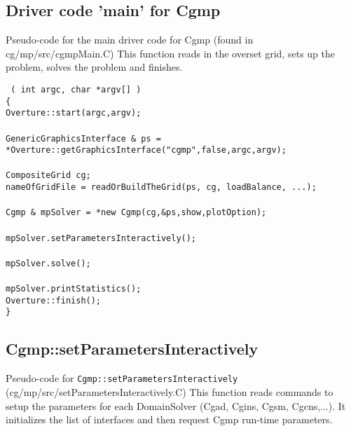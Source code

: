 \newcommand{\WHILE}{{\blue while}}
\newcommand{\ELSE}{{\blue else}}

\subsection{Driver code 'main' for Cgmp}
Pseudo-code for the main driver code for Cgmp (found in cg/mp/src/cgmpMain.C)
This function reads in the overset grid, sets up the problem, solves the problem and finishes.

\begin{flushleft}\tt\small
{}( int argc, char *argv[] ) \\
\{  \\
\ia Overture::start(argc,argv);   \\ 
\ia {}  \\
\ia  GenericGraphicsInterface \& ps = *Overture::getGraphicsInterface("cgmp",false,argc,argv); \\
\ia \\ 
\ia  CompositeGrid cg;  \\ 
\ia  nameOfGridFile = readOrBuildTheGrid(ps, cg, loadBalance, ...);  \\
\ia \\ 
\ia  Cgmp \& mpSolver = *new Cgmp(cg,\&ps,show,plotOption); \\
\ia \\
\ia  mpSolver.setParametersInteractively();  \\
\ia \\
\ia  mpSolver.solve();           \\
\ia \\
\ia  mpSolver.printStatistics();  \\
\ia  Overture::finish();  \\
\}
\end{flushleft}



\subsection{Cgmp::setParametersInteractively}
Pseudo-code for {\tt Cgmp::setParametersInteractively} (cg/mp/src/setParametersInteractively.C)
This function reads commands to setup the parameters for each DomainSolver (Cgad, Cgins, Cgsm, Cgcns,...).
It initializes the list of interfaces and then request Cgmp run-time parameters.

